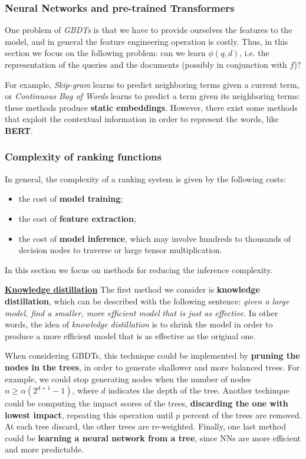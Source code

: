 \subsubsection{Neural Networks and pre-trained Transformers}
One problem of \textit{GBDTs} is that we have to provide ourselves the features to the model, and in general the feature engineering operation is costly. Thus, in this section we focus on the following problem: can we learn $\phi(q,d)$, i.e. the representation of the queries and the documents (possibly in conjunction with $f$)?

For example, \textit{Skip-gram} learns to predict neighboring terms given a current term, or \textit{Continuous Bag of Words} learns to predict a term given its neighboring terms: these methods produce \textbf{static embeddings}. However, there exist some methods that exploit the contextual information in order to represent the words, like \textbf{BERT}.

\subsubsection{Complexity of ranking functions}\label{5.6.3}
In general, the complexity of a ranking system is given by the following costs:

\begin{itemize}
    \item the cost of \textbf{model training};
    \item the cost of \textbf{feature extraction};
    \item the cost of \textbf{model inference}, which may involve hundreds to thousands of decision nodes to traverse or large tensor multiplication.
\end{itemize}

In this section we focus on methods for reducing the inference complexity.

\underline{\textbf{Knowledge distillation}}
The first method we consider is \textbf{knowledge distillation}, which can be described with the following sentence: \textit{given a large model, find a smaller, more efficient model that is just as effective}. In other words, the idea of \textit{knowledge distillation} is to shrink the model in order to produce a more efficient model that is as effective as the original one. 

When considering GBDTs, this technique could be implemented by \textbf{pruning the nodes in the trees}, in order to generate shallower and more balanced trees. For example, we could stop generating nodes when the number of nodes $n \geq \alpha (2^{d+1} - 1)$, where $d$ indicates the depth of the tree. Another techinque could be computing the impact scores of the trees, \textbf{discarding the one with lowest impact}, repeating this operation until $p$ percent of the trees are removed. At each tree discard, the other trees are re-weighted. Finally, one last method could be \textbf{learning a neural network from a tree}, since NNs are more efficient and more predictable.

